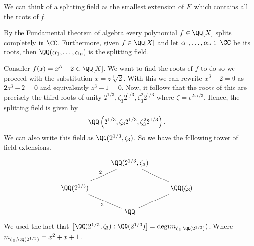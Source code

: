 \documentclass[12pt, a4paper]{article}
\begin{document}
\begin{mdnote}
    We can think of a splitting field as the smallest extension of \(K\) which contains all the roots of \(f\).
\end{mdnote}

\begin{example}
    By the Fundamental theorem of algebra every polynomial \(f\in \QQ[X]\) splits completely in \(\CC\). Furthermore, given \(f\in \QQ[X]\) and let \(\alpha_1,\ldots,\alpha_n \in \CC\) be its roots, then \(\QQ(\alpha_1,\ldots,\alpha_n)\) is the splitting field.
\end{example}

\begin{mdexample}
    Consider \(f(x)= x^3-2\in \QQ[X]\). We want to find the roots of \(f\) to do so we proceed with the substitution \(x=z\sqrt[3]{2}\). With this we can rewrite \(x^3-2=0\) as \(2z^3-2=0\) and equivalently \(z^3-1=0\). Now, it follows that the roots of this are precisely the third roots of unity \(2^{1/3},\zeta_3 2^{1/3},\zeta_3^2 2^{1/3}\) where \(\zeta=e^{2\pi i/3}\). Hence, the splitting field is given by 
    \[\QQ\left( 2^{1/3},\zeta_3 2^{1/3},\zeta_3^2 2^{1/3} \right).\]
    We can also write this field as \(\QQ(2^{1/3},\zeta_3)\). So we have the following tower of field extensions.
    \[\begin{tikzcd}
        & {\QQ(2^{1/3},\zeta_3)} \\
        {\QQ(2^{1/3})} && {\QQ(\zeta_3)} \\
        & \QQ
        \arrow["2", no head, from=2-1, to=1-2]
        \arrow[no head, from=2-3, to=1-2]
        \arrow["3", no head, from=3-2, to=2-1]
        \arrow[no head, from=3-2, to=2-3]
    \end{tikzcd}\]
    We used the fact that \(\left[ \QQ(2^{1/3},\zeta_3) :\QQ(2^{1/3})\right]=\deg(m_{\zeta_3,\QQ(2^{1/3})})\). Where \(m_{\zeta_3,\QQ(2^{1/3})} = x^2+x+1\). 
\end{mdexample}
\end{document}
